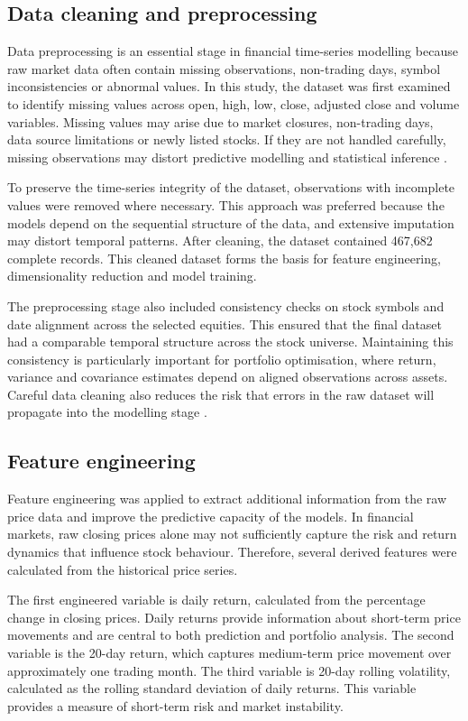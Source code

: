 \subsection{Data cleaning and preprocessing}

Data preprocessing is an essential stage in financial time-series modelling because raw market data often contain missing observations, non-trading days, symbol inconsistencies or abnormal values. In this study, the dataset was first examined to identify missing values across open, high, low, close, adjusted close and volume variables. Missing values may arise due to market closures, non-trading days, data source limitations or newly listed stocks. If they are not handled carefully, missing observations may distort predictive modelling and statistical inference \citep{schafer2002missing}.

To preserve the time-series integrity of the dataset, observations with incomplete values were removed where necessary. This approach was preferred because the models depend on the sequential structure of the data, and extensive imputation may distort temporal patterns. After cleaning, the dataset contained 467,682 complete records. This cleaned dataset forms the basis for feature engineering, dimensionality reduction and model training.

The preprocessing stage also included consistency checks on stock symbols and date alignment across the selected equities. This ensured that the final dataset had a comparable temporal structure across the stock universe. Maintaining this consistency is particularly important for portfolio optimisation, where return, variance and covariance estimates depend on aligned observations across assets. Careful data cleaning also reduces the risk that errors in the raw dataset will propagate into the modelling stage \citep{azuaje2006mining}.

\subsection{Feature engineering}

Feature engineering was applied to extract additional information from the raw price data and improve the predictive capacity of the models. In financial markets, raw closing prices alone may not sufficiently capture the risk and return dynamics that influence stock behaviour. Therefore, several derived features were calculated from the historical price series.

The first engineered variable is daily return, calculated from the percentage change in closing prices. Daily returns provide information about short-term price movements and are central to both prediction and portfolio analysis. The second variable is the 20-day return, which captures medium-term price movement over approximately one trading month. The third variable is 20-day rolling volatility, calculated as the rolling standard deviation of daily returns. This variable provides a measure of short-term risk and market instability.

